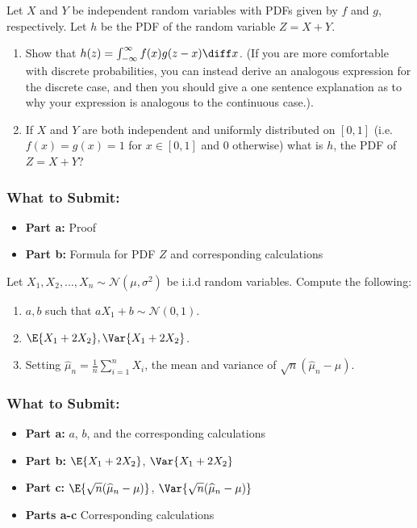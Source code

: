 \documentclass{article}
\begin{document}
\begin{aprob}
    Let $X$ and $Y$ be independent random variables with PDFs given by $f$ and $g$, respectively.
    Let $h$ be the PDF of the random variable $Z = X+Y$.
    \begin{enumerate}
        \item {} Show that $h(z) = \int_{-\infty}^\infty f(x) g( z - x ) \diff x $.  (If you are more comfortable with discrete probabilities, you can instead derive an analogous expression for the discrete case,  and then you should give a one sentence explanation as to why your expression is analogous to the continuous case.).
        \item {} If $X$ and $Y$ are both independent and uniformly distributed on $[0,1]$ (i.e. $f(x)=g(x)=1$ for $x \in [0,1]$ and $0$ otherwise) what is $h$, the PDF of $Z=X+Y$?
    \end{enumerate}

    \subsubsection*{What to Submit:}
    \begin{itemize}
        \item \textbf{Part a:} Proof
        \item \textbf{Part b:} Formula for PDF $Z$ and corresponding calculations
    \end{itemize}
\end{aprob}

\begin{aprob}
    Let $X_1, X_2, ..., X_n \sim \mathcal{N}(\mu, \sigma^2)$ be i.i.d random variables. Compute the following:
    \begin{enumerate}
        \item {} $a,b$ such that $aX_1+b \sim \mathcal{N}(0,1)$.
        \item {} $\E{X_1 + 2X_2}, \Var{X_1 + 2X_2}$.
        \item {} Setting $\widehat{\mu}_n = \frac{1}{n} \sum_{i=1}^n X_i$, the mean and variance of $\sqrt{n}(\widehat{\mu}_n - \mu)$.
    \end{enumerate}

    \subsubsection*{What to Submit:}
    \begin{itemize}
        \item \textbf{Part a:} $a$, $b$, and the corresponding calculations
        \item \textbf{Part b:} $\E{X_1 + 2X_2}$, $\Var{X_1 + 2X_2}$
        \item \textbf{Part c:} $\E{\sqrt{n}(\widehat{\mu}_n - \mu)}$, $\Var{\sqrt{n}(\widehat{\mu}_n - \mu)}$
        \item \textbf{Parts a-c} Corresponding calculations
    \end{itemize}
\end{aprob}
\end{document}
